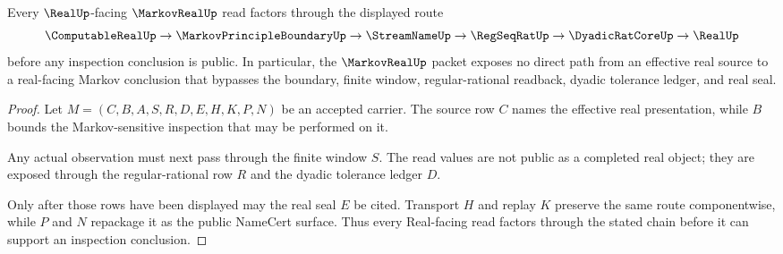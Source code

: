 \begin{theorem}
\label{thm:markov-real-regseqrat-handoff}
Every $\RealUp$-facing $\MarkovRealUp$ read factors through the displayed route
$$
\ComputableRealUp \to \MarkovPrincipleBoundaryUp \to \StreamNameUp \to \RegSeqRatUp \to \DyadicRatCoreUp \to \RealUp
$$
before any inspection conclusion is public. In particular, the $\MarkovRealUp$ packet exposes no direct path from an effective real source to a real-facing Markov conclusion that bypasses the boundary, finite window, regular-rational readback, dyadic tolerance ledger, and real seal.
\end{theorem}
\begin{proof}
Let $M=(C,B,A,S,R,D,E,H,K,P,N)$ be an accepted carrier. The source row $C$ names the effective real presentation, while $B$ bounds the Markov-sensitive inspection that may be performed on it.

Any actual observation must next pass through the finite window $S$. The read values are not public as a completed real object; they are exposed through the regular-rational row $R$ and the dyadic tolerance ledger $D$.

Only after those rows have been displayed may the real seal $E$ be cited. Transport $H$ and replay $K$ preserve the same route componentwise, while $P$ and $N$ repackage it as the public NameCert surface. Thus every Real-facing read factors through the stated chain before it can support an inspection conclusion.
\end{proof}


\begin{closurestatus}{\MarkovRealUp}
  \theoryclosure{\seedClosure}
  \formalstatus{\unformalizedV}
\end{closurestatus}
